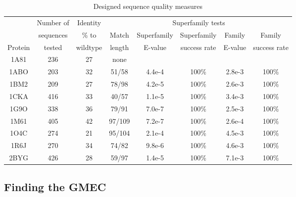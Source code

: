 \begin{table}[!htbp]                            
\caption{Designed sequence quality measures}
\small
\label{tab:quality}                      
\begin{center}
\begin{tabular}{cccccccc} \hline \hline  
        & Number of & Identity & \multicolumn{5}{c}{\hrulefill Superfamily tests \hrulefill}   \\
        & sequences & \% to    & Match & Superfamily & Superfamily  & Family  & Family        \\
Protein & tested    & wildtype & length & E-value     & success rate & E-value & success rate  \\ \hline
1A81    & 236       & 27       & none   &             &              &         &               \\
1ABO    & 203       & 32       & 51/58  & 4.4e-4      & 100\%        & 2.8e-3  & 100\%         \\
1BM2    & 209       & 27       & 78/98  & 4.2e-5      & 100\%        & 2.6e-3  & 100\%         \\
1CKA    & 416       & 33       & 40/57  & 1.1e-5      & 100\%        & 3.4e-3  & 100\%         \\
1G9O    & 338       & 36       & 79/91  & 7.0e-7      & 100\%        & 2.5e-3  & 100\%         \\
1M61    & 405       & 42       & 97/109 & 7.2e-7      & 100\%        & 2.6e-4  & 100\%         \\
1O4C    & 274       & 21       & 95/104 & 2.1e-4      & 100\%        & 4.5e-3  & 100\%         \\
1R6J    & 270       & 34       & 74/82  & 9.8e-6      & 100\%        & 4.6e-3  & 100\%         \\
2BYG    & 426       & 28       & 59/97  & 1.4e-5      & 100\%        & 7.1e-3  & 100\%         \\ \hline
\end{tabular}
\end{center}
\end{table}



\subsection{Finding the GMEC}

